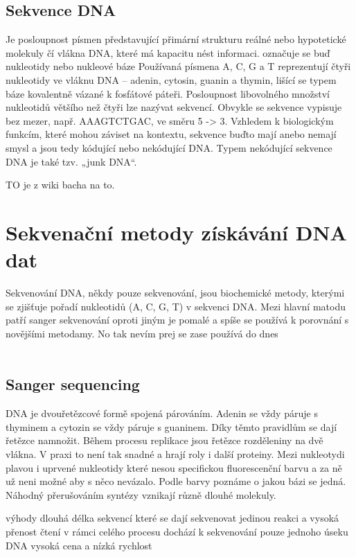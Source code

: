 \documentclass[czech,DP]{thesiskiv}
\begin{document}
\section{Sekvence DNA}
Je posloupnost písmen představující přimární strukturu reálné nebo hypotetické molekuly čí vlákna DNA, které má kapacitu nést informaci.
označuje se buď nukleotidy nebo nukleové báze
Používaná písmena A, C, G a T reprezentují čtyři nukleotidy ve vláknu DNA – adenin, cytosin, guanin a thymin, lišící se 
typem báze kovalentně vázané k fosfátové páteři. Posloupnost libovolného množství nukleotidů většího než čtyři lze nazývat 
sekvencí. Obvykle se sekvence vypisuje bez mezer, např. AAAGTCTGAC, ve směru 5 -> 3. Vzhledem k biologickým funkcím, které 
mohou záviset na kontextu, sekvence buďto mají anebo nemají smysl a jsou tedy kódující nebo nekódující DNA. Typem nekódující 
sekvence DNA je také tzv. „junk DNA“.

TO je z wiki bacha na to.


\chapter{Sekvenační metody získávání DNA dat}
Sekvenování DNA, někdy pouze sekvenování, jsou biochemické metody, kterými se zjišťuje pořadí nukleotidů (A, C, G, T) v sekvenci DNA. Mezi hlavní matodu patří sanger sekvenování oproti jiným je pomalé a spíše se používá k porovnání s novějšími metodamy. No tak nevím prej se zase používá do dnes
\cite{sekvenovani_ziva}
\\
\\
\section{Sanger sequencing}
DNA je dvouřetězcové formě spojená párováním. Adenin se vždy páruje s thyminem a cytozin se vždy páruje s guaninem. Díky těmto pravidlům se dají řetězce namnožit. 
Během procesu replikace jsou řetězce rozděleniny na dvě vlákna. 
V praxi to není tak snadné a hrají roly i další proteiny. 
Mezi nukleotydi plavou i uprvené nukleotidy které nesou specifickou fluorescenční barvu a za ně už neni možné aby s něco nevázalo.  Podle barvy poznáme o jakou bázi se jedná. 
Náhodný přerušováním syntézy vznikají různě dlouhé molekuly. 

výhody dlouhá délka sekvencí které se dají sekvenovat jedinou reakci a vysoká přenost čtení
v rámci celého procesu dochází k sekvenování pouze jednoho úseku DNA 
vysoká cena a nízká rychlost
\end{document}
